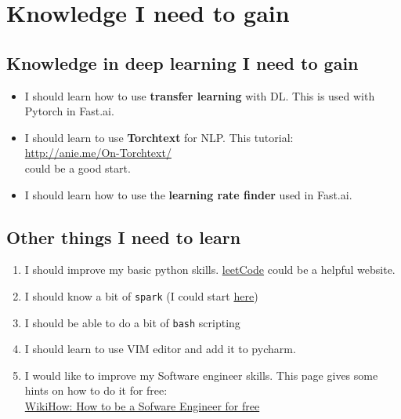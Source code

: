 \documentclass[11pt,a4paper]{article}
\begin{document}
\section{Knowledge I need to gain}

\subsection{Knowledge in deep learning I need to gain}
\begin{itemize}
\item I should learn how to use \textbf{transfer learning} with DL. This is used with Pytorch in Fast.ai.
\item I should learn to use \textbf{Torchtext} for NLP. This tutorial:\\
\url{http://anie.me/On-Torchtext/}\\
could be a good start.
\item I should learn how to use the \textbf{learning rate finder} used in Fast.ai.
\end{itemize}

\subsection{Other things I need to learn}
\begin{enumerate}
\item I should improve my basic python skills. \href{https://leetcode.com/problemset/all/}{leetCode} could be a helpful website.
\item I should know a bit of \texttt{spark} (I could start \href{https://www.kdnuggets.com/2015/11/introduction-spark-python.html}{here})
\item I should be able to do a bit of \texttt{bash} scripting
\item I should learn to use VIM editor and add it to pycharm.
\item I would like to improve my Software engineer skills. This page gives some hints on how to do it for free:\\
\href{https://www.wikihow.com/Learn-How-to-Be-a-Software-Engineer-for-Free#}{WikiHow: How to be a Sofware Engineer for free}
\end{enumerate}
\end{document}
